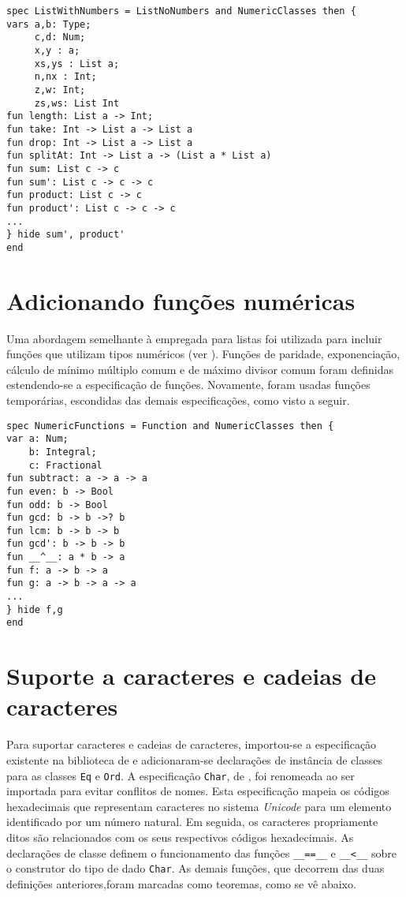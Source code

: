 \begin{Verbatim}
spec ListWithNumbers = ListNoNumbers and NumericClasses then {
vars a,b: Type;
     c,d: Num;
     x,y : a;
     xs,ys : List a;
     n,nx : Int;
     z,w: Int;
     zs,ws: List Int
fun length: List a -> Int;
fun take: Int -> List a -> List a
fun drop: Int -> List a -> List a
fun splitAt: Int -> List a -> (List a * List a)
fun sum: List c -> c
fun sum': List c -> c -> c
fun product: List c -> c
fun product': List c -> c -> c
...
} hide sum', product'
end
\end{Verbatim}

\section{Adicionando funções numéricas}
Uma abordagem semelhante à empregada para listas foi utilizada para incluir funções que utilizam tipos numéricos (ver ).
Funções de paridade, exponenciação, cálculo de mínimo múltiplo comum e de máximo divisor comum foram definidas estendendo-se a especificação de funções.
Novamente, foram usadas funções temporárias, escondidas das demais especificações, como visto a seguir.

\begin{Verbatim}
spec NumericFunctions = Function and NumericClasses then {
var a: Num;
    b: Integral;
    c: Fractional
fun subtract: a -> a -> a
fun even: b -> Bool
fun odd: b -> Bool
fun gcd: b -> b ->? b
fun lcm: b -> b -> b
fun gcd': b -> b -> b
fun __^__: a * b -> a
fun f: a -> b -> a
fun g: a -> b -> a -> a
...
} hide f,g
end
\end{Verbatim}

\section{Suporte a caracteres e cadeias de caracteres}
Para suportar caracteres e cadeias de caracteres, importou-se a especificação existente na biblioteca de \CASL e adicionaram-se declarações de instância de classes para as classes \Verb.Eq. e \Verb.Ord..
A especificação \Verb.Char., de \CASL, foi renomeada ao ser importada para evitar conflitos de nomes.
Esta especificação mapeia os códigos hexadecimais que representam caracteres no sistema \textit{Unicode} para um elemento identificado por um número natural.
Em seguida, os caracteres propriamente ditos são relacionados com os seus respectivos códigos hexadecimais.
As declarações de classe definem o funcionamento das funções \Verb.__==__. e \Verb.__<__. sobre o construtor do tipo de dado \Verb.Char..
As demais funções, que decorrem das duas definições anteriores,foram marcadas como teoremas, como se vê abaixo.


